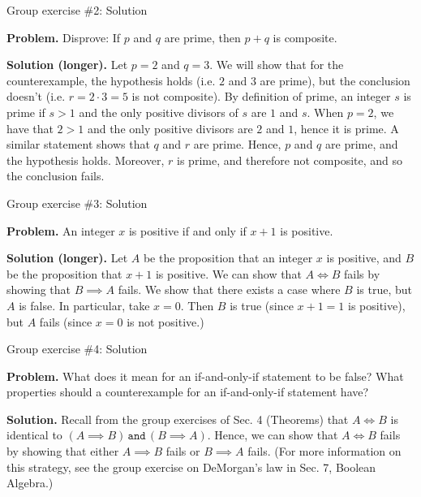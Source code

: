 \documentclass[10pt]{beamer}
\begin{document}
\begin{frame}{Group exercise \#2: Solution}

\textbf{Problem.} Disprove: If $p$ and $q$ are prime, then $p+q$ is composite.
\vfill 

\textbf{Solution (longer).}  Let $p=2$ and $q=3$. We will show that for the counterexample, the hypothesis holds (i.e. $2$ and $3$ are prime), but the conclusion doesn't (i.e. $r=2 \cdot 3 = 5$ is not composite).  By definition of prime, an integer $s$ is prime if $s>1$ and the only positive divisors of $s$ are $1$ and $s$.   When $p=2$, we have that $2>1$ and the only positive divisors are $2$ and $1$, hence it is prime.  A similar statement shows that $q$ and $r$ are prime.  Hence, $p$ and $q$ are prime, and the hypothesis holds.  Moreover, $r$ is prime, and therefore not composite, and so the conclusion fails.   
\end{frame}


\begin{frame}{Group exercise \#3: Solution}

\textbf{Problem.} An integer $x$ is positive if and only if $x+1$ is positive.
\vfill 

\textbf{Solution (longer).}  Let $A$ be the proposition that an integer $x$ is positive, and $B$ be the proposition that $x+1$ is positive.  We can show that $A \iff B$ fails by showing that $B \implies A$ fails.   We show that there exists a case where $B$ is true, but $A$ is false.  In particular, take $x=0$. Then $B$ is true (since $x+1=1$ is positive), but $A$ fails (since $x=0$ is not positive.)   
\end{frame}

\begin{frame}{Group exercise \#4: Solution}

\textbf{Problem.} What does it mean for an if-and-only-if statement to be false? What properties should a counterexample for an if-and-only-if statement have?
\vfill 

\textbf{Solution.} Recall from the group exercises of Sec. 4 (Theorems) that $A \iff B$ is identical to $(A \implies B) \, \texttt{and} \, (B \implies A)$.  Hence, we can show that $A \iff B$ fails by showing that either $A \implies B$ fails or $B \implies A$ fails.  (For more information on this strategy, see the group exercise on DeMorgan's law in Sec. 7, Boolean Algebra.)
\end{frame}
\end{document}
